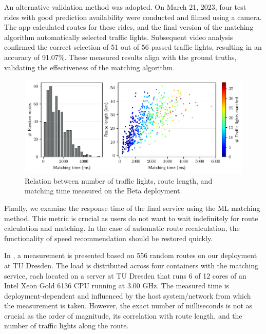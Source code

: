 An alternative validation method was adopted. On March 21, 2023, four test rides with good prediction availability were conducted and filmed using a camera. The app calculated routes for these rides, and the final version of the matching algorithm automatically selected traffic lights. Subsequent video analysis confirmed the correct selection of 51 out of 56 passed traffic lights, resulting in an accuracy of 91.07\%. These measured results align with the ground truths, validating the effectiveness of the matching algorithm.

\begin{figure}[t]
\centering 
\includegraphics[width=\linewidth]{images/matching-performance-556-routes.pdf}
\caption{Relation between number of traffic lights, route length, and matching time measured on the Beta deployment.}
\label{fig:matching-performance}
\end{figure}

Finally, we examine the response time of the final service using the ML matching method. This metric is crucial as users do not want to wait indefinitely for route calculation and matching. In the case of automatic route recalculation, the functionality of speed recommendation should be restored quickly.

In , a measurement is presented based on 556 random routes on our deployment at TU Dresden. The load is distributed across four containers with the matching service, each located on a server at TU Dresden that runs 6 of 12 cores of an Intel Xeon Gold 6136 CPU running at 3.00 GHz. The measured time is deployment-dependent and influenced by the host system/network from which the measurement is taken. However, the exact number of milliseconds is not as crucial as the order of magnitude, its correlation with route length, and the number of traffic lights along the route.

